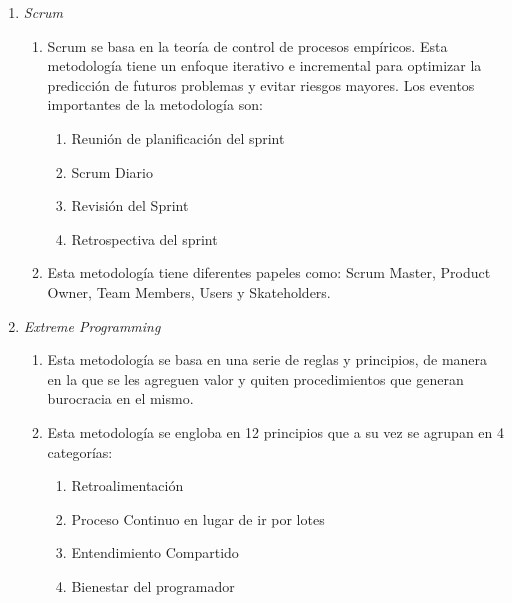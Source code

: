 \documentclass{article} %
\begin{document}
\begin{enumerate}
\item \textbf{ }\textit{Scrum}

\begin{enumerate}
\item \textit{ }Scrum se basa en la teor\'{i}a de control de procesos emp\'{i}ricos. Esta metodolog\'{i}a tiene un enfoque iterativo e incremental para optimizar la predicci\'{o}n de futuros problemas y evitar riesgos mayores.  Los eventos importantes de la metodolog\'{i}a son:

\begin{enumerate}
\item  Reuni\'{o}n de planificaci\'{o}n del sprint

\item  Scrum Diario

\item  Revisi\'{o}n del Sprint

\item  Retrospectiva del sprint
\end{enumerate}

\item  Esta metodolog\'{i}a tiene diferentes papeles como: Scrum Master, Product Owner, Team Members, Users y Skateholders.
\end{enumerate}

\item  \textit{Extreme Programming}

\begin{enumerate}
\item \textit{ } Esta metodolog\'{i}a se basa en una serie de reglas y principios, de manera en la que se les agreguen valor y quiten procedimientos que generan burocracia en el mismo.

\item  Esta metodolog\'{i}a se engloba en 12 principios que a su vez se agrupan en 4 categor\'{i}as:

\begin{enumerate}
\item  Retroalimentaci\'{o}n

\item  Proceso Continuo en lugar de ir por lotes

\item  Entendimiento Compartido

\item  Bienestar del programador
\end{enumerate}
\end{enumerate}


\end{enumerate}
\end{document}
